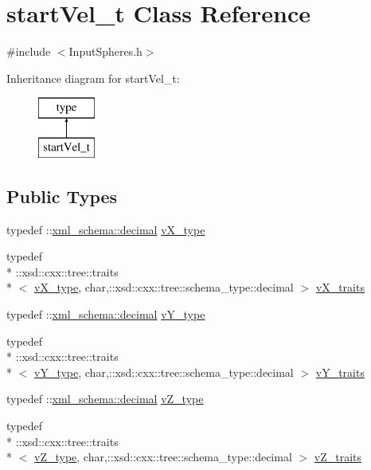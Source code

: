 \hypertarget{classstartVel__t}{\section{start\-Vel\-\_\-t Class Reference}
\label{classstartVel__t}
}


{\ttfamily \#include $<$Input\-Spheres.\-h$>$}

Inheritance diagram for start\-Vel\-\_\-t\-:\begin{figure}[H]
\begin{center}
\leavevmode
\includegraphics[height=2.000000cm]{classstartVel__t}
\end{center}
\end{figure}
\subsection*{Public Types}
\begin{DoxyCompactItemize}
\item 
typedef \-::\hyperlink{namespacexml__schema_a69bfaf24f63a8c18ebd8e21db6b343df}{xml\-\_\-schema\-::decimal} \hyperlink{classstartVel__t_a4f5683f832e22f177e3dd87c931333fb}{v\-X\-\_\-type}
\item 
typedef \\*
\-::xsd\-::cxx\-::tree\-::traits\\*
$<$ \hyperlink{classstartVel__t_a4f5683f832e22f177e3dd87c931333fb}{v\-X\-\_\-type}, char,\-::xsd\-::cxx\-::tree\-::schema\-\_\-type\-::decimal $>$ \hyperlink{classstartVel__t_aed77c2d2723441913480ac21aa2424a2}{v\-X\-\_\-traits}
\item 
typedef \-::\hyperlink{namespacexml__schema_a69bfaf24f63a8c18ebd8e21db6b343df}{xml\-\_\-schema\-::decimal} \hyperlink{classstartVel__t_ae5903806f237d8ceddf10c273a3d2002}{v\-Y\-\_\-type}
\item 
typedef \\*
\-::xsd\-::cxx\-::tree\-::traits\\*
$<$ \hyperlink{classstartVel__t_ae5903806f237d8ceddf10c273a3d2002}{v\-Y\-\_\-type}, char,\-::xsd\-::cxx\-::tree\-::schema\-\_\-type\-::decimal $>$ \hyperlink{classstartVel__t_a3048aec0781a452ce20e59c13368a62a}{v\-Y\-\_\-traits}
\item 
typedef \-::\hyperlink{namespacexml__schema_a69bfaf24f63a8c18ebd8e21db6b343df}{xml\-\_\-schema\-::decimal} \hyperlink{classstartVel__t_ae5f77efcbc29e3290d1f36cb89fbd2bf}{v\-Z\-\_\-type}
\item 
typedef \\*
\-::xsd\-::cxx\-::tree\-::traits\\*
$<$ \hyperlink{classstartVel__t_ae5f77efcbc29e3290d1f36cb89fbd2bf}{v\-Z\-\_\-type}, char,\-::xsd\-::cxx\-::tree\-::schema\-\_\-type\-::decimal $>$ \hyperlink{classstartVel__t_ad5aed7020c09d4d3eea549d4f2b34aa4}{v\-Z\-\_\-traits}
\end{DoxyCompactItemize}
